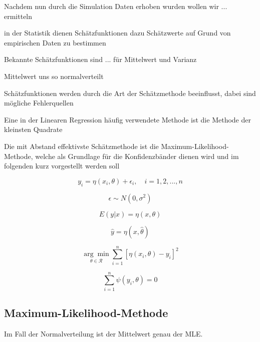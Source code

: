 Nachdem nun durch die Simulation Daten erhoben wurden wollen wir ... ermitteln

in der Statistik dienen Schätzfunktionen dazu Schätzwerte auf Grund von empirischen Daten zu bestimmen

Bekannte Schätzfunktionen sind ... für Mittelwert und Varianz

Mittelwert uns so normalverteilt

Schätzfunktionen werden durch die Art der Schätzmethode beeinflusst, dabei sind mögliche Fehlerquellen

Eine in der Linearen Regression häufig verwendete Methode ist die Methode der kleinsten Quadrate 

Die mit Abstand effektivste Schätzmethode ist die Maximum-Likelihood-Methode, welche als Grundlage für die Konfidenzbänder dienen wird und im folgenden kurz vorgestellt werden soll

\begin{equation}
y_i = \eta(x_i, \theta)+ \epsilon_i, \quad i=1,2,...,n
\end{equation}

\begin{equation}
\epsilon \sim N(0, \sigma^2)
\end{equation}

\begin{equation}
E(y | x) = \eta(x, \theta)
\end{equation}

\begin{equation}
\hat{y} = \eta(x, \hat{\theta})
\end{equation}

\begin{equation}
\underset{\theta \in \mathcal{R}}{\arg\min} \sum_{i=1}^n \left[ \eta(x_i,\theta) - y_i \right]^2
\end{equation}

\begin{equation}
\sum_{i=1}^n \psi(y_i, \theta) = 0
\end{equation}

\subsection{Maximum-Likelihood-Methode}

Im Fall der Normalverteilung ist der Mittelwert genau der MLE.

